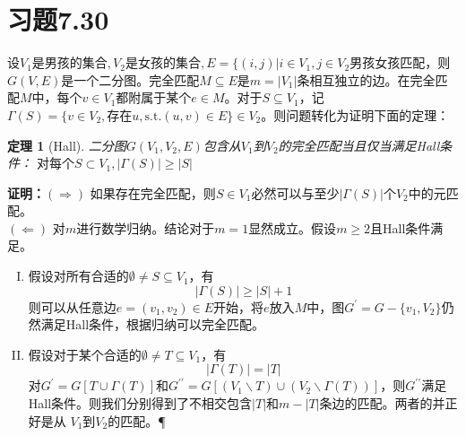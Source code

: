 \documentclass[a4paper,onecolumn,12pt]{article}
\newtheorem{theorem}{定理}
\numberwithin{equation}{section}
\begin{document}
\section*{习题7.30}
设$V_1\text{是男孩的集合},V_2\text{是女孩的集合},E=\{(i,j)|i\in V_1,j\in
V_2\text{男孩女孩匹配}$，则$G(V,E)$是一个二分图。完全匹配$M\subseteq
E$是$m=|V_1|$条相互独立的边。在完全匹配$M$中，每个$v\in V_1$都附属于某个$e\in M$。对于$S\subseteq V_1$，记
$\Gamma (S)=\{v\in V_2,\text{存在}u,\text{s.t.}(u,v)\in E\}\in V_2$。则问题转化为证明下面的定理：
\begin{theorem}[Hall]
\upshape 二分图$G(V_1,V_2,E)$包含从$V_1$到$V_2$的完全匹配当且仅当满足Hall条件：
$\text{对每个}S\subset V_1,|\Gamma(S)|\geq |S|$
\end{theorem}
\textbf{证明：}$(\Rightarrow)$ 如果存在完全匹配，则$S\in V_1$必然可以与至少$|\Gamma (S)|$个$V_2$中的元匹配。\\
$(\Leftarrow)$ 对$m$进行数学归纳。结论对于$m=1$显然成立。假设$m\geq 2$且Hall条件满足。
\begin{enumerate}[(I)]
  \item 假设对所有合适的$\emptyset\neq S\subseteq V_1$，有
\begin{equation*}
|\Gamma(S)|\geq |S|+1
\end{equation*}
则可以从任意边$e=(v_1,v_2)\in
E$开始，将$e$放入$M$中，图$G^{\prime}=G-\{v_1,V_2\}$仍然满足Hall条件，根据归纳可以完全匹配。
\item 假设对于某个合适的$\emptyset\neq T\subseteq V_1$，有
\begin{equation*}
|\Gamma(T)|=|T|
\end{equation*}
对$G^{\prime}=G\left[T\cup
\Gamma(T)\right]$和$G^{\prime\prime}=G\left[(V_1\backslash T)\cup
(V_2\backslash
\Gamma(T))\right]$，则$G^{\prime\prime}$满足Hall条件。则我们分别得到了不相交包含$|T|$和$m-|T|$条边的匹配。两者的并正好是从
$V_1$到$V_2$的匹配。\P
\end{enumerate}
\end{document}

